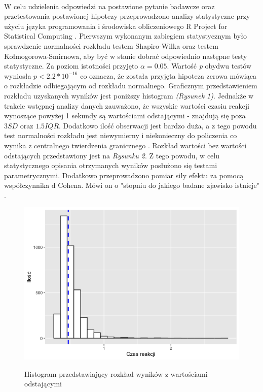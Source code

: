 \documentclass[12pt,a4paper,final,oneside,onecolumn,titlepage]{article}
\begin{document}
\paragraph{}
W celu udzielenia odpowiedzi na postawione pytanie badawcze oraz przetestowania postawionej hipotezy przeprowadzono analizy statystyczne przy użyciu języka programowania i środowiska obliczeniowego R Project for Statistical Computing \citep{r_core_team_r_2022}. Pierwszym wykonanym zabiegiem statystycznym było sprawdzenie normalności rozkładu testem Shapiro-Wilka oraz testem Kołmogorowa-Smirnowa, aby być w stanie dobrać odpowiednio następne testy statystyczne. Za poziom istotności przyjęto $\alpha = 0.05$. Wartość \textit{p} obydwu testów wyniosła $p < 2.2*10^{-16}$ co oznacza, że została przyjęta hipoteza zerowa mówiąca o rozkładzie odbiegającym od rozkładu normalnego. Graficznym przedstawieniem rozkładu uzyskanych wyników jest poniższy histogram \textit{(Rysunek 1)}. Jednakże w trakcie wstępnej analizy danych zauważono, że wszyskie wartości czasiu reakcji wynoszące powyżej 1 sekundy są wartościami odstającymi - znajdują się poza $3SD$ oraz $1.5IQR$. Dodatkowo ilość obserwacji jest bardzo duża, a z tego powodu test normalności rozkładu jest niewymierny i niekonieczny do policzenia co wynika z centralnego twierdzenia granicznego \citep{kwak_central_2017}. Rozkład wartości bez wartości odstających przedstawiony jest na \textit{Rysunku 2}. Z tego powodu, w celu statystycznego opisania otrzymanych wyników posłużono się testami parametrycznymi. Dodatkowo przeprowadzono pomiar siły efektu za pomocą współczynnika d Cohena. Mówi on o "stopniu do jakiego badane zjawisko istnieje" \citep[s. 5]{cohen_statistical_1977}. 
\begin{figure}[H]
\centering
\caption{Histogram przedstawiający rozkład wyników z wartościami odstającymi}
\includegraphics[scale=0.5]{hist1}
\label{Rysunek}
\end{figure}
\end{document}
